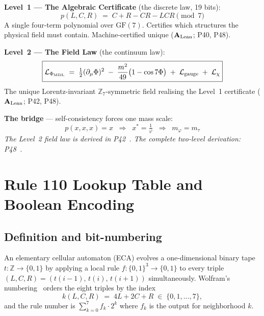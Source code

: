 \documentclass[11pt]{article}
\theoremstyle{remark}
\newcommand{\CatAL}{\ensuremath{\textbf{A}_{\rm Lean}}}
\begin{document}
\begin{tcolorbox}[colback=green!4,colframe=green!55!black,
  title={\textbf{The Two Laws: One Framework, Two Levels}},
  fonttitle=\small\bfseries, left=8pt, right=8pt, top=6pt, bottom=6pt,
  breakable]
\small

\medskip\noindent
\textbf{Level~1 --- The Algebraic Certificate} (the discrete law, 19 bits):
\[
  \boxed{p(L,C,R) \;=\; C + R - CR - LCR \pmod{7}}
\]
A single four-term polynomial over $\mathrm{GF}(7)$.
Certifies which structures the physical field must contain.
Machine-certified unique (\CatAL; P40, P48).

\medskip\noindent
\textbf{Level~2 --- The Field Law} (the continuum law):
\[
  \boxed{\mathcal{L}_{\Phi_{\mathrm{MDL}}} \;=\; \tfrac{1}{2}(\partial_\mu\Phi)^2
    \;-\;\frac{m^2}{49}\bigl(1 - \cos 7\Phi\bigr)
    \;+\;\mathcal{L}_{\rm gauge}\;+\;\mathcal{L}_\chi}
\]
The unique Lorentz-invariant $\mathbb{Z}_7$-symmetric field realising the
Level~1 certificate (\CatAL; P42, P48).

\medskip\noindent
\textbf{The bridge} --- self-consistency forces one mass scale:
\[
  \boxed{p(x,x,x) = x \;\;\Longrightarrow\;\; x^* = \tfrac{1}{\varphi}
    \;\;\Longrightarrow\;\; m_\varphi = m_\tau}
\]
\emph{The Level~2 field law is derived in P42~\cite{SpivackPhiMDLField}. The complete two-level derivation: P48~\cite{SpivackGTECompleteFramework}.}
\end{tcolorbox}

\section{Rule 110 Lookup Table and Boolean Encoding}
\label{sec:lookup}

\subsection{Definition and bit-numbering}

An elementary cellular automaton (ECA) evolves a one-dimensional binary tape
$t : \mathbb{Z} \to \{0,1\}$ by applying a local rule $f : \{0,1\}^3 \to \{0,1\}$
to every triple $(L,C,R) = (t(i-1),\, t(i),\, t(i+1))$ simultaneously.
Wolfram's numbering~\cite{Wolfram2002} orders the eight triples by the index
\[
  k(L,C,R) \;=\; 4L + 2C + R \;\in\; \{0,1,\ldots,7\},
\]
and the rule number is $\sum_{k=0}^{7} f_k \cdot 2^k$ where $f_k$ is the output for
neighborhood $k$.
\end{document}
